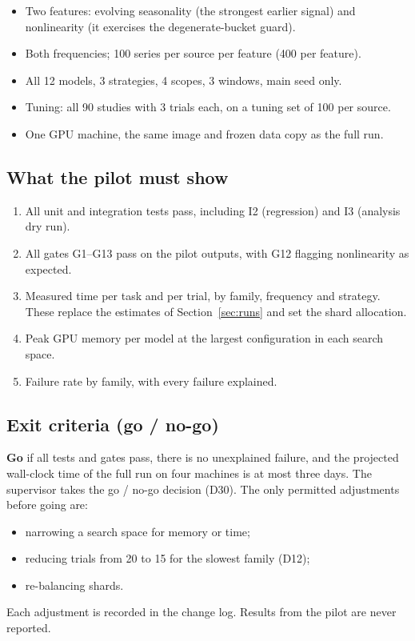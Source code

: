 \documentclass[11pt,a4paper]{article}
\begin{document}
\begin{itemize}
  \item Two features: evolving seasonality (the strongest earlier signal) and nonlinearity (it
  exercises the degenerate-bucket guard).
  \item Both frequencies; 100 series per source per feature (400 per feature).
  \item All 12 models, 3 strategies, 4 scopes, 3 windows, main seed only.
  \item Tuning: all 90 studies with 3 trials each, on a tuning set of 100 per source.
  \item One GPU machine, the same image and frozen data copy as the full run.
\end{itemize}

\subsection{What the pilot must show}

\begin{enumerate}
  \item All unit and integration tests pass, including I2 (regression) and I3 (analysis dry run).
  \item All gates G1--G13 pass on the pilot outputs, with G12 flagging nonlinearity as expected.
  \item Measured time per task and per trial, by family, frequency and strategy. These replace the
  estimates of Section~\ref{sec:runs} and set the shard allocation.
  \item Peak GPU memory per model at the largest configuration in each search space.
  \item Failure rate by family, with every failure explained.
\end{enumerate}

\subsection{Exit criteria (go / no-go)}

\textbf{Go} if all tests and gates pass, there is no unexplained failure, and the projected
wall-clock time of the full run on four machines is at most three days. The supervisor takes the
go / no-go decision (D30). The only permitted adjustments before going are:
\begin{itemize}
  \item narrowing a search space for memory or time;
  \item reducing trials from 20 to 15 for the slowest family (D12);
  \item re-balancing shards.
\end{itemize}
Each adjustment is recorded in the change log. Results from the pilot are never reported.
\end{document}
